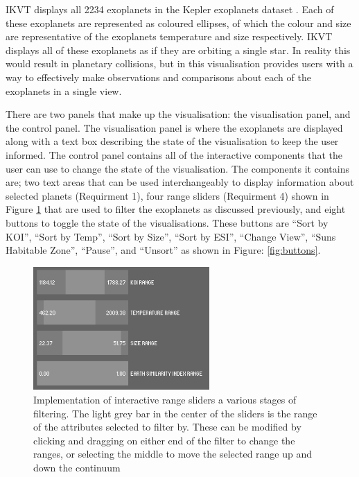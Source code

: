 IKVT displays all 2234 exoplanets
in the Kepler exoplanets dataset \cite{dataset}. Each of these exoplanets are
represented as coloured
ellipses, of which the colour and size are representative of the exoplanets
temperature and size respectively. IKVT displays all of these exoplanets as if
they are orbiting a single star. In reality this would result in planetary
collisions, but in this visualisation provides users with a way to effectively
make observations and comparisons about each of the exoplanets in a single
view. 

There are two panels that make up the visualisation: the visualisation panel,
and the control panel. The visualisation panel is where the exoplanets
are displayed along with a text box describing the state of the visualisation
to
keep the user informed. The control panel contains all of the interactive
components that the user can use to change the state of the visualisation. The
components it contains are; two text areas that can be used interchangeably to
display information about selected planets (Requirment 1), four range sliders
(Requirment 4) shown in Figure 
\ref{fig:sliders} that are used to
filter the exoplanets as discussed previously, and eight buttons to toggle the
state of the visualisations. These buttons are ``Sort by KOI'', ``Sort by Temp'',
``Sort by Size'', ``Sort by ESI'', ``Change View'', ``Suns Habitable Zone'', ``Pause'',
and ``Unsort'' as shown in Figure: \ref{fig:buttons}. 

\begin{figure}[H]
  \centering
      \includegraphics[width=0.6\textwidth]{images/sliders.jpg}
  \caption[Implementation of interactive range sliders]{Implementation of
interactive range sliders a various stages of filtering. The light grey bar in
the center of the sliders is the range of the attributes selected to filter by.
These can be modified by clicking and dragging on either end of the filter to
change the ranges, or selecting the middle to move the selected range up and
down the continuum}
  \label{fig:sliders}
\end{figure}

